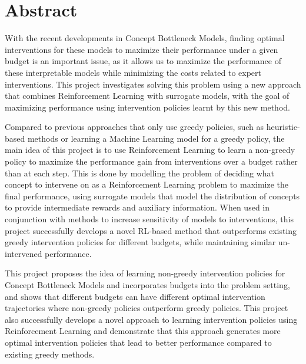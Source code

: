 \documentclass[../main.tex]{subfiles}
\begin{document}
\chapter*{Abstract}


With the recent developments in Concept Bottleneck Models,
finding optimal interventions for these models
to maximize their performance under a given budget is an important issue, as it allows
us to maximize the performance of these interpretable models while minimizing
the costs related to expert interventions. This project investigates solving this problem
using a new approach that combines Reinforcement Learning with surrogate models, with the goal
of maximizing performance using intervention policies learnt by this new method.

Compared to 
previous approaches that only use greedy policies, 
such as heuristic-based methods or learning a Machine Learning model for a greedy policy,
the main idea of this project
is to use Reinforcement Learning to learn a non-greedy policy to maximize the performance
gain from interventions over a budget rather than at each step. This is done by modelling the problem 
of deciding
what concept to intervene on as a Reinforcement Learning problem to maximize the final performance,
using surrogate models that model the distribution of concepts to provide intermediate rewards and 
auxiliary information. 
When used in conjunction
with methods to increase sensitivity of models to interventions, this project successfully develops a novel
RL-based method that outperforms existing greedy intervention policies for different budgets, while maintaining
similar un-intervened performance. 

This project proposes the idea of learning non-greedy
intervention policies for Concept Bottleneck Models and incorporates budgets into the problem setting, 
and shows that
different budgets can have different optimal intervention trajectories where
non-greedy policies outperform greedy policies.
This project also successfully develops a novel approach to learning intervention policies using
Reinforcement Learning and demonstrate that this approach generates 
more optimal intervention policies
that lead to better performance
compared to existing greedy methods.
\end{document}
